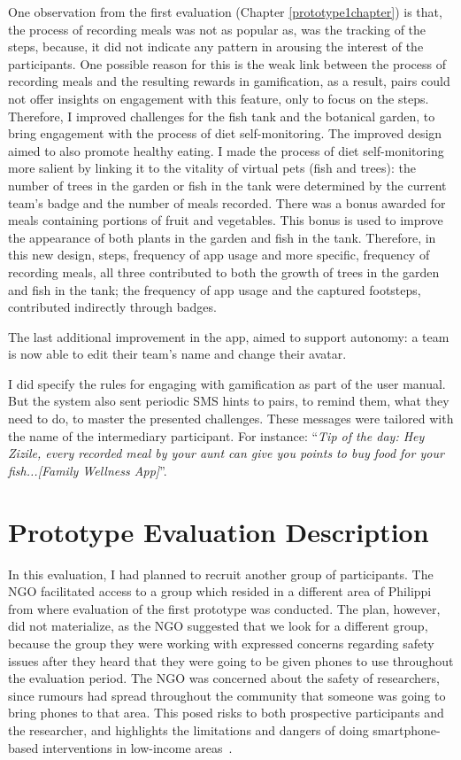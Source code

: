 One observation from the first evaluation (Chapter \ref{prototype1chapter}) is that, the process of recording meals was not as popular as, was the tracking of the steps, because, it did not indicate any pattern in arousing the interest of the participants. One possible reason for this is the weak link between the process of recording meals and the resulting rewards in gamification, as a result, pairs could not offer insights on engagement with this feature, only to focus on the steps. Therefore, I improved challenges for the fish tank and the botanical garden, to bring engagement with the process of diet self-monitoring. The improved design aimed to also promote healthy eating. I made the process of diet self-monitoring more salient by linking it to the vitality of virtual pets (fish and trees): the number of trees in the garden or fish in the tank were determined by the current team's badge and the number of meals recorded. There was a bonus awarded for meals containing portions of fruit and vegetables. This bonus is used to improve the appearance of both plants in the garden and fish in the tank. Therefore, in this new design, steps, frequency of app usage and more specific, frequency of recording meals, all three contributed to both the growth of trees in the garden and fish in the tank; the frequency of app usage and the captured footsteps, contributed indirectly through badges. 

The last additional improvement in the app, aimed to support autonomy: a team is now able to edit their team's name and change their avatar.

I did  specify the rules for engaging with gamification as part of the user manual. But the system also sent periodic SMS hints to pairs, to remind them, what they need to do, to master the presented challenges. These messages were tailored with the name of the intermediary participant. For instance: ``\emph{Tip of the day: Hey Zizile, every recorded meal by your aunt can give you points to buy food for your fish...[Family Wellness App]}''. 
 
\section{Prototype Evaluation Description}
In this evaluation, I had planned to recruit another group of participants. The NGO facilitated access to a group which resided in a different area of Philippi from where evaluation of the first prototype was conducted. The plan, however, did not materialize, as the NGO suggested that we look for a different group, because the group they were working with expressed concerns regarding safety issues after they heard that they were going to be given phones to use throughout the evaluation period. The NGO was concerned about the safety of researchers, since rumours had spread throughout the community that someone was going to bring phones to that area. This posed risks to both prospective participants and the researcher, and highlights the limitations and dangers of doing smartphone-based interventions in low-income areas~\citep{Molapo2015}. 

